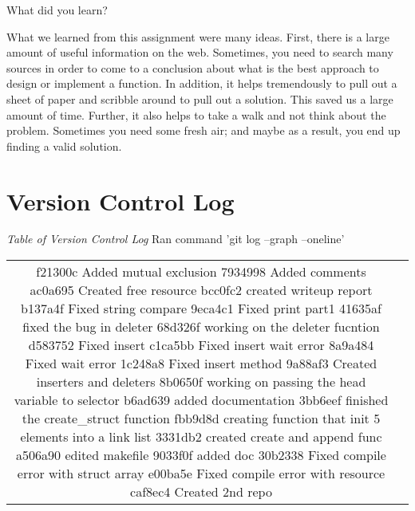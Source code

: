 \documentclass{article}
\newenvironment{question}[2][Question]{\begin{trivlist}
\item[\hskip \labelsep {\bfseries #1}\hskip \labelsep {\bfseries #2.}]}{\end{trivlist}}
\begin{document}

\vspace{0.25in}
\begin{question}{4}
What did you learn?
\end{question}
What we learned from this assignment were many ideas. First, there is a large amount of useful information on the web. Sometimes, you need to search many sources in order to come to a conclusion about what is the best approach to design or implement a function. In addition, it helps tremendously to pull out a sheet of paper and scribble around to pull out a solution. This saved us a large amount of time. Further, it also helps to take a walk and not think about the problem. Sometimes you need some fresh air; and maybe as a result, you end up finding a valid solution.

\section*{Version Control Log}
\textit{Table of Version Control Log} Ran command 'git log --graph --oneline'
\newline
\begin{center}
\begin{tabular}{ c c }
f21300c Added mutual exclusion
7934998 Added comments
ac0a695 Created free resource
bcc0fc2 created writeup report
b137a4f Fixed string compare
9eca4c1 Fixed print part1
41635af fixed the bug in deleter
68d326f working on the deleter fucntion
d583752 Fixed insert
c1ca5bb Fixed insert wait error
8a9a484 Fixed wait error
1c248a8 Fixed insert method
9a88af3 Created inserters and deleters
8b0650f working on passing the head variable to selector
b6ad639 added documentation
3bb6eef finished the create_struct function
fbb9d8d creating function that init 5 elements into a link list
3331db2 created create and append func
a506a90 edited makefile
9033f0f added doc
30b2338 Fixed compile error with struct array
e00ba5e Fixed compile error with resource
caf8ec4 Created 2nd repo

\end{tabular}
\end{center}

\end{document}

